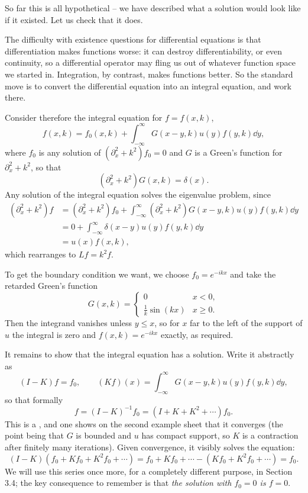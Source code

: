 So far this is all hypothetical -- we have described what a solution would look like if it existed. Let us check that it does.

The difficulty with existence questions for differential equations is that differentiation makes functions worse: it can destroy differentiability, or even continuity, so a differential operator may fling us out of whatever function space we started in. Integration, by contrast, makes functions better. So the standard move is to convert the differential equation into an integral equation, and work there.

Consider therefore the integral equation for $f = f(x,k)$,
$$
f(x,k) = f_0(x,k) + \int_{-\infty}^\infty G(x-y,k)u(y)f(y,k)\dd y,
$$
where $f_0$ is any solution of $(\partial_x^2 + k^2)f_0 = 0$ and $G$ is a Green's function for $\partial_x^2 + k^2$, so that
$$
(\partial_x^2 + k^2)G(x,k) = \delta(x).
$$
Any solution of the integral equation solves the eigenvalue problem, since
\begin{align*}
	(\partial_x^2+k^2)f &= (\partial_x^2+k^2)f_0 + \int_{-\infty}^\infty(\partial_x^2+k^2)G(x-y,k)u(y)f(y,k)\dd y\\
	&= 0 + \int_{-\infty}^\infty\delta(x-y)u(y)f(y,k)\dd y\\
	&= u(x)f(x,k),
\end{align*}
which rearranges to $Lf = k^2f$.

To get the boundary condition we want, we choose $f_0 = e^{-ikx}$ and take the retarded Green's function
$$
G(x,k) = \begin{cases}0 & x<0,\\ \frac{1}{k}\sin(kx) & x\ge 0.\end{cases}
$$
Then the integrand vanishes unless $y \le x$, so for $x$ far to the left of the support of $u$ the integral is zero and $f(x,k) = e^{-ikx}$ exactly, as required.

It remains to show that the integral equation has a solution. Write it abstractly as
$$
(I - K)f = f_0, \qquad (Kf)(x) = \int_{-\infty}^\infty G(x-y,k)u(y)f(y,k)\dd y,
$$
so that formally
$$
f = (I-K)^{-1}f_0 = \left(I + K + K^2 + \cdots\right)f_0.
$$
This is a , and one shows on the second example sheet that it converges (the point being that $G$ is bounded and $u$ has compact support, so $K$ is a contraction after finitely many iterations). Given convergence, it visibly solves the equation:
$$
(I-K)\left(f_0 + Kf_0 + K^2f_0+\cdots\right) = f_0 + Kf_0 + \cdots - \left(Kf_0 + K^2f_0 + \cdots\right) = f_0.
$$
We will use this series once more, for a completely different purpose, in Section 3.4; the key consequence to remember is that \emph{the solution with $f_0 = 0$ is $f = 0$}.

